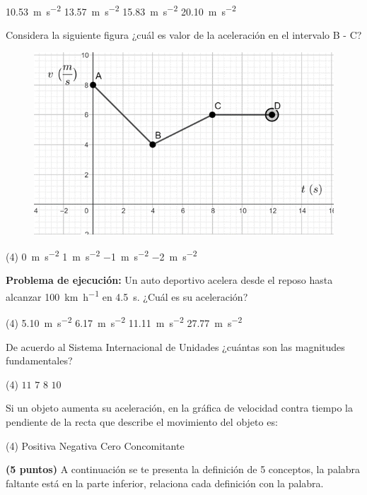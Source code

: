 \documentclass[12pt, letter]{exam}
\begin{document}
\begin{questions}
\begin{tasks}
        \task \SI{10.53}{\meter\per\square\second}
        \task \SI{13.57}{\meter\per\square\second}
        \task \SI{15.83}{\meter\per\square\second}
        \task \SI{20.10}{\meter\per\square\second}
    \end{tasks}
    \question Considera la siguiente figura ¿cuál es valor de la aceleración en el intervalo B - C?
    \begin{figure}[H]
        \centering
        \includegraphics[scale=1.5]{Imagenes/Examen_Grafica_02.png}
    \end{figure}
    \begin{tasks}(4)
        \task \SI{0}{\meter\per\square\second}
        \task \SI{1}{\meter\per\square\second}
        \task \SI{-1}{\meter\per\square\second}
        \task \SI{-2}{\meter\per\square\second}
    \end{tasks}
    \question \textbf{Problema de ejecución:} Un auto deportivo acelera desde el reposo hasta alcanzar \SI{100}{\kilo\meter\per\hour} en \SI{4.5}{\second}. ¿Cuál es su aceleración?
    \begin{tasks}(4)
        \task \SI{5.10}{\meter\per\square\second}
        \task \SI{6.17}{\meter\per\square\second}
        \task \SI{11.11}{\meter\per\square\second}
        \task \SI{27.77}{\meter\per\square\second}
    \end{tasks}
    \question De acuerdo al Sistema Internacional de Unidades ¿cuántas son las magnitudes fundamentales?
     \begin{tasks}(4)
         \task $11$
         \task $7$
         \task $8$
         \task $10$
     \end{tasks}
     \question Si un objeto aumenta su aceleración, en la gráfica de velocidad contra tiempo la pendiente de la recta que describe el movimiento del objeto es:
    \begin{tasks}(4)
        \task Positiva
        \task Negativa
        \task Cero
        \task Concomitante        
    \end{tasks}
    \question \textbf{(5 puntos)} A continuación se te presenta la definición de 5 conceptos, la palabra faltante está en la parte inferior, relaciona cada definición con la palabra.
    \begin{parts}

\end{parts}
\end{questions}
\end{document}
